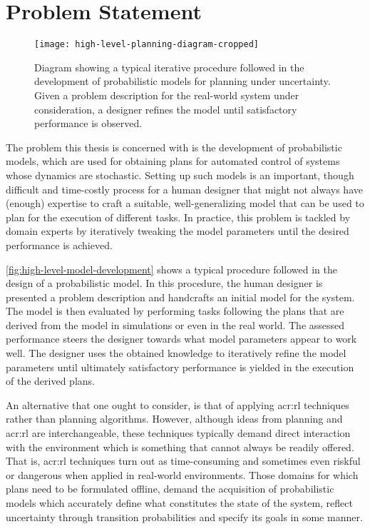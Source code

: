 
\section{Problem Statement}
\label{sec:problem-description}

\begin{figure}[t]
	\centering
	\texttt{[image: high-level-planning-diagram-cropped]}
	\caption{Diagram showing a typical iterative procedure followed in the development of probabilistic models for planning under uncertainty. Given a problem description for the real-world system under consideration, a designer refines the model until satisfactory performance is observed.}
	\label{fig:high-level-model-development}
\end{figure}

The problem this thesis is concerned with is the development of probabilistic models, which are used for obtaining plans for automated control of systems whose dynamics are stochastic.
Setting up such models is an important, though difficult and time-costly process for a human designer that might not always have (enough) expertise to craft a suitable, well-generalizing model that can be used to plan for the execution of different tasks.
In practice, this problem is tackled by domain experts by iteratively tweaking the model parameters until the desired performance is achieved.

\autoref{fig:high-level-model-development} shows a typical procedure followed in the design of a probabilistic model.
In this procedure, the human designer is presented a problem description and handcrafts an initial model for the system.
The model is then evaluated by performing tasks following the plans that are derived from the model in simulations or even in the real world.
The assessed performance steers the designer towards what model parameters appear to work well.
The designer uses the obtained knowledge to iteratively refine the model parameters until ultimately satisfactory performance is yielded in the execution of the derived plans.

An alternative that one ought to consider, is that of applying \acrshort{acr:rl} techniques rather than planning algorithms.
However, although ideas from planning and \acrshort{acr:rl} are interchangeable, these techniques typically demand direct interaction with the environment which is something that cannot always be readily offered.
That is, \acrshort{acr:rl} techniques turn out as time-consuming and sometimes even riskful or dangerous when applied in real-world environments.
Those domains for which plans need to be formulated offline, demand the acquisition of probabilistic models which accurately define what constitutes the state of the system, reflect uncertainty through transition probabilities and specify its goals in some manner.%

